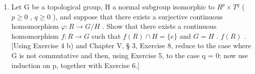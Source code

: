 \begin{enumerate}
\def\labelenumi{\arabic{enumi})}
\setcounter{enumi}{6}
\tightlist
\item
  Let G be a topological group, H a normal subgroup isomorphic to \(R^{p} \times T^{q}\) ( \(p \geqslant 0\) , \(q \geqslant 0\) ), and suppose that there exists a surjective continuous homomorphism \(\varphi: R \to G/H\) . Show that there exists a continuous homomorphism \(f: R \to G\) such that \(f(R) \cap H = \{e\}\) and \(G = H\) . \(f(R)\) . {[}Using Exercise 4 b) and Chapter V, § 3, Exercise 8, reduce to the case where G is not commutative and then, using Exercise 5, to the case q = 0; now use induction on p, together with Exercise 6.{]}
\end{enumerate}

